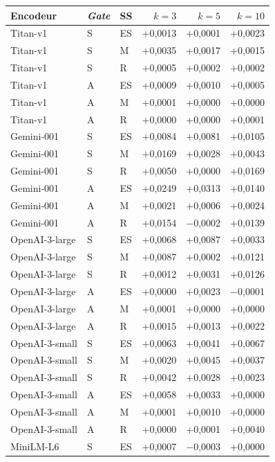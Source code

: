 \documentclass[a4paper,10pt]{article}
\begin{document}
\begin{table}[p]
\centering
\small
\begin{tabular}{lllrrr}
\toprule
Encodeur & \textit{Gate} & SS & $k=3$ & $k=5$ & $k=10$ \\
\midrule
Titan-v1 & S & ES & +0,0013 & +0,0001 & +0,0023 \\
Titan-v1 & S & M & +0,0035 & +0,0017 & +0,0015 \\
Titan-v1 & S & R & +0,0005 & +0,0002 & +0,0002 \\
Titan-v1 & A & ES & +0,0009 & +0,0010 & +0,0005 \\
Titan-v1 & A & M & +0,0001 & +0,0000 & +0,0000 \\
Titan-v1 & A & R & +0,0000 & +0,0000 & +0,0001 \\
\midrule
Gemini-001 & S & ES & +0,0084 & +0,0081 & +0,0105 \\
Gemini-001 & S & M & +0,0169 & +0,0028 & +0,0043 \\
Gemini-001 & S & R & +0,0050 & +0,0000 & +0,0169 \\
Gemini-001 & A & ES & +0,0249 & +0,0313 & +0,0140 \\
Gemini-001 & A & M & +0,0021 & +0,0006 & +0,0024 \\
Gemini-001 & A & R & +0,0154 & $-$0,0002 & +0,0139 \\
\midrule
OpenAI-3-large & S & ES & +0,0068 & +0,0087 & +0,0033 \\
OpenAI-3-large & S & M & +0,0087 & +0,0002 & +0,0121 \\
OpenAI-3-large & S & R & +0,0012 & +0,0031 & +0,0126 \\
OpenAI-3-large & A & ES & +0,0000 & +0,0023 & $-$0,0001 \\
OpenAI-3-large & A & M & +0,0001 & +0,0000 & +0,0000 \\
OpenAI-3-large & A & R & +0,0015 & +0,0013 & +0,0022 \\
\midrule
OpenAI-3-small & S & ES & +0,0063 & +0,0041 & +0,0067 \\
OpenAI-3-small & S & M & +0,0020 & +0,0045 & +0,0037 \\
OpenAI-3-small & S & R & +0,0042 & +0,0028 & +0,0023 \\
OpenAI-3-small & A & ES & +0,0058 & +0,0033 & +0,0000 \\
OpenAI-3-small & A & M & +0,0001 & +0,0010 & +0,0000 \\
OpenAI-3-small & A & R & +0,0000 & +0,0001 & +0,0040 \\
\midrule
MiniLM-L6 & S & ES & +0,0007 & $-$0,0003 & +0,0000 \\

\end{tabular}
\end{table}
\end{document}
